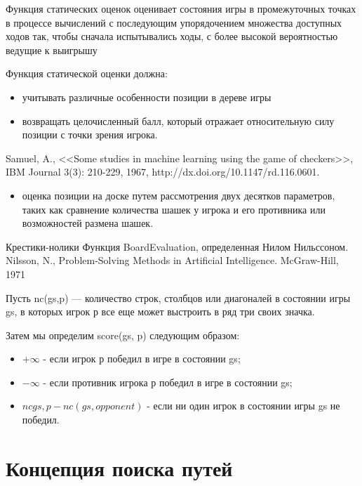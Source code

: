 \documentclass{beamer}
\begin{document}
\begin{frame}
\begin{block}{Функция статических оценок}
оценивает состояния игры в промежуточных точках в процессе вычислений с последующим упорядочением множества доступных ходов так, чтобы сначала испытывались ходы, с более высокой вероятностью ведущие к выигрышу
\end{block}
Функция статической оценки должна:
\begin{itemize}
\item учитывать различные особенности позиции в дереве игры 
\item возвращать целочисленный балл, который отражает относительную силу позиции с точки зрения игрока. 
\end{itemize} 
Samuel, A., <<Some studies in machine learning using the game of checkers>>, IBM Journal
3(3): 210-229, 1967, http://dx.doi.org/10.1147/rd.116.0601.
\begin{itemize}
\item оценка позиции на доске путем рассмотрения двух десятков параметров, таких как сравнение количества шашек у игрока и его противника или возможностей размена шашек.
\end{itemize}
\end{frame}

\begin{frame}{Крестики-нолики}
Функция BoardEvaluation, определенная Нилом Нильссоном. Nilsson, N., Problem-Solving Methods in Artificial Intelligence. McGraw-Hill, 1971

Пусть nc(gs,p) — количество строк, столбцов или диагоналей в состоянии игры gs, в которых игрок р все еще может выстроить в ряд три своих значка. 

Затем мы определим score(gs, p) следующим образом:
\begin{itemize}
\item $+\infty$ - если игрок р победил в игре в состоянии gs;
\item $-\infty$ - если противник игрока р победил в игре в состоянии gs;
\item $nc{gs,p}-nc(gs, opponent)$ - если ни один игрок в состоянии игры gs не победил.
\end{itemize}
\end{frame}

\section{Концепция поиска путей}
\end{document}
